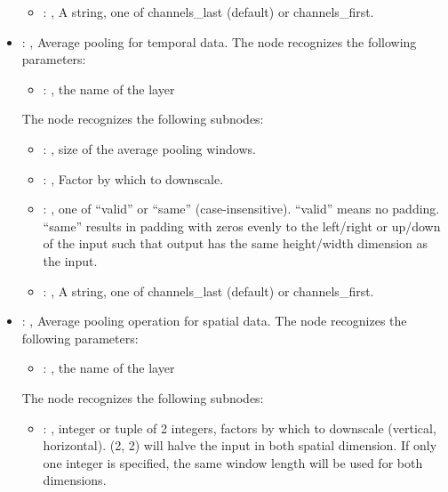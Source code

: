 \begin{itemize}
\begin{itemize}
        \item {}: , 
          A string, one of channels\_last (default) or channels\_first.
      \end{itemize}

    \item {}: , 
      Average pooling for temporal data.
      The  node recognizes the following parameters:
        \begin{itemize}
          \item {}: , 
            the name of the layer
      \end{itemize}

      The  node recognizes the following subnodes:
      \begin{itemize}
        \item {}: , 
          size of the average pooling windows.

        \item {}: , 
          Factor by which to downscale.

        \item {}: , 
          one of ``valid'' or ``same'' (case-insensitive). ``valid'' means no padding. ``same''
          results in padding         with zeros evenly to the left/right or up/down of the input
          such that output has the same height/width         dimension as the input.

        \item {}: , 
          A string, one of channels\_last (default) or channels\_first.
      \end{itemize}

    \item {}: , 
      Average pooling operation for spatial data.
      The  node recognizes the following parameters:
        \begin{itemize}
          \item {}: , 
            the name of the layer
      \end{itemize}

      The  node recognizes the following subnodes:
      \begin{itemize}
        \item {}: , 
          integer or tuple of 2 integers, factors by which to downscale (vertical, horizontal). (2,
          2) will         halve the input in both spatial dimension. If only one integer is
          specified, the same window length will         be used for both dimensions.


\end{itemize}
\end{itemize}
